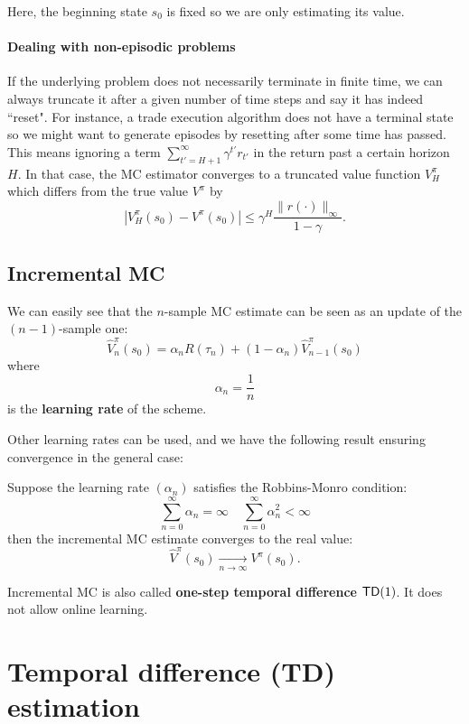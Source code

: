 \documentclass[../course-notes.tex]{subfiles}
\begin{document}
Here, the beginning state $s_0$ is fixed so we are only estimating its value.


\paragraph{Dealing with non-episodic problems} If the underlying problem does not necessarily terminate in finite time, we can always truncate it after a given number of time steps and say it has indeed ``reset". For instance, a trade execution algorithm does not have a terminal state so we might want to generate episodes by resetting after some time has passed. This means ignoring a term $\sum_{t'=H+1}^\infty \gamma^{t'} r_{t'}$ in the return past a certain horizon $H$. In that case, the MC estimator converges to a truncated value function $V_H^\pi$ which differs from the true value $V^\pi$ by
\[
	|V_H^\pi(s_0) - V^\pi(s_0)| \leq \gamma^H\frac{\| r(\cdot)\|_\infty}{1 - \gamma}.
\]


\subsection{Incremental MC}

We can easily see that the $n$-sample MC estimate can be seen as an update of the $(n-1)$-sample one:
\[
	\widehat{V}_{n}^\pi(s_0) = \alpha_n R(\tau_{n}) + (1-\alpha_n) \widehat{V}^\pi_{n-1}(s_0)
\]
where
\[
	\alpha_n = \frac{1}{n}
\]
is the \textbf{learning rate} of the scheme.

Other learning rates can be used, and we have the following result ensuring convergence in the general case:
\begin{prop}
	Suppose the learning rate $(\alpha_n)$ satisfies the Robbins-Monro condition:
	\begin{equation}
	\sum_{n=0}^{\infty} \alpha_n = \infty \quad
	\sum_{n=0}^{\infty} \alpha_n^2 < \infty
	\end{equation}
	then the incremental MC estimate converges to the real value:
	\[
		\widehat{V}^\pi(s_0) \xrightarrow[n\to\infty]{} V^\pi(s_0).
	\]
\end{prop}

Incremental MC is also called \textbf{one-step temporal difference} $\mathsf{TD}(1)$. It does not allow online learning.



\section{Temporal difference (TD) estimation}
\end{document}
